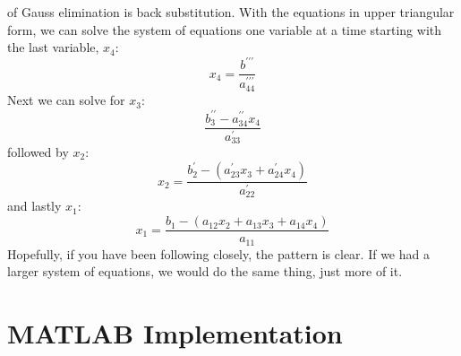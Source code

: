  of Gauss elimination is back substitution.  With the equations in upper triangular form, we can solve the system of equations one variable at a time starting with the last variable, $x_4$:  
\begin{equation*}
x_{4} = \frac{b^{\prime \prime \prime}}{a^{\prime \prime \prime}_{44}}
\end{equation*}
Next we can solve for $x_3$:
\begin{equation*}
\frac{b^{\prime \prime}_3 - a^{\prime \prime}_{34}x_4}{a^{\prime}_{33}}
\end{equation*}
followed by $x_2$:
\begin{equation*}
x_{2} = \frac{b^{\prime}_2 - (a^{\prime}_{23}x_3 + a^{\prime}_{24}x_4) }{a^{\prime}_{22}}
\end{equation*}
and lastly $x_1$:
\begin{equation*}
x_1 = \frac{b_1 - (a_{12}x_2 + a_{13}x_3 + a_{14}x_4)}{a_{11}}
\end{equation*}
Hopefully, if you have been following closely, the pattern is clear. If we had a larger system of equations, we would do the same thing, just more of it.

\section{MATLAB Implementation}

